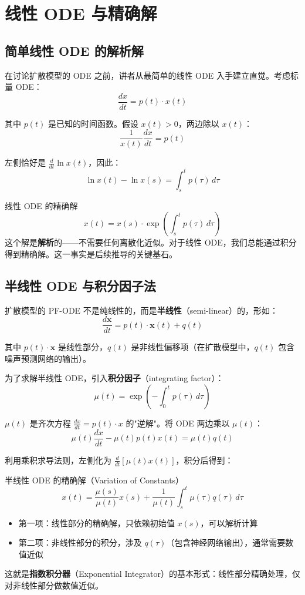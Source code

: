 \section{线性 ODE 与精确解}

\subsection{简单线性 ODE 的解析解}

在讨论扩散模型的 ODE 之前，讲者从最简单的线性 ODE 入手建立直觉。考虑标量 ODE：
$$\frac{dx}{dt} = p(t) \cdot x(t)$$

其中 $p(t)$ 是已知的时间函数。假设 $x(t) > 0$，两边除以 $x(t)$：
$$\frac{1}{x(t)} \frac{dx}{dt} = p(t)$$

左侧恰好是 $\frac{d}{dt} \ln x(t)$，因此：
$$\ln x(t) - \ln x(s) = \int_s^t p(\tau)\, d\tau$$

\begin{importantbox}{线性 ODE 的精确解}
$$x(t) = x(s) \cdot \exp\left(\int_s^t p(\tau)\, d\tau\right)$$
这个解是\textbf{解析}的——不需要任何离散化近似。对于线性 ODE，我们总能通过积分得到精确解。这一事实是后续推导的关键基石。
\end{importantbox}

\subsection{半线性 ODE 与积分因子法}

扩散模型的 PF-ODE 不是纯线性的，而是\textbf{半线性}（semi-linear）的，形如：
$$\frac{d\mathbf{x}}{dt} = p(t) \cdot \mathbf{x}(t) + q(t)$$

其中 $p(t) \cdot \mathbf{x}$ 是线性部分，$q(t)$ 是非线性偏移项（在扩散模型中，$q(t)$ 包含噪声预测网络的输出）。

为了求解半线性 ODE，引入\textbf{积分因子}（integrating factor）：
$$\mu(t) = \exp\left(-\int_0^t p(\tau)\, d\tau\right)$$

$\mu(t)$ 是齐次方程 $\frac{dx}{dt} = p(t) \cdot x$ 的"逆解"。将 ODE 两边乘以 $\mu(t)$：
$$\mu(t) \frac{dx}{dt} - \mu(t) p(t) x(t) = \mu(t) q(t)$$

利用乘积求导法则，左侧化为 $\frac{d}{dt}\left[\mu(t) x(t)\right]$，积分后得到：

\begin{importantbox}{半线性 ODE 的精确解（Variation of Constants）}
$$x(t) = \frac{\mu(s)}{\mu(t)} x(s) + \frac{1}{\mu(t)} \int_s^t \mu(\tau) q(\tau)\, d\tau$$
\begin{itemize}
    \item 第一项：线性部分的精确解，只依赖初始值 $x(s)$，可以解析计算
    \item 第二项：非线性部分的积分，涉及 $q(\tau)$（包含神经网络输出），通常需要数值近似
\end{itemize}
这就是\textbf{指数积分器}（Exponential Integrator）的基本形式：线性部分精确处理，仅对非线性部分做数值近似。
\end{importantbox}

